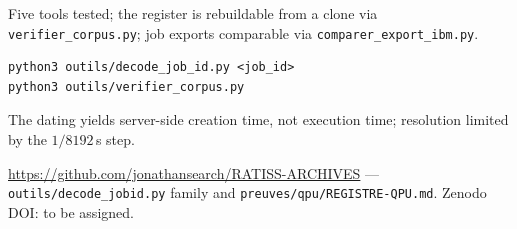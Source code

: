 \documentclass[10pt]{article}
\begin{document}
Five tools tested; the register is rebuildable from a clone via
\texttt{verifier\_corpus.py}; job exports comparable via \texttt{comparer\_export\_ibm.py}.

\begin{verbatim}
python3 outils/decode_job_id.py <job_id>
python3 outils/verifier_corpus.py
\end{verbatim}

The dating yields server-side creation time, not execution time; resolution limited by
the $1/8192$\,s step.

\url{https://github.com/jonathansearch/RATISS-ARCHIVES} ---
\texttt{outils/decode\_jobid.py} family and \texttt{preuves/qpu/REGISTRE-QPU.md}.
Zenodo DOI: to be assigned.

\sourcefoot
\end{document}
